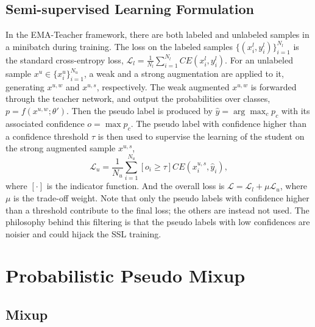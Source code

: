 \documentclass{article}
\begin{document}
\subsection{Semi-supervised Learning Formulation}

In the EMA-Teacher framework, there are both labeled and unlabeled
samples in a minibatch during training. 
The loss on the labeled samples $\{(x^l_i,y^l_i)\}^{N_l}_{i=1}$ is the standard cross-entropy loss, $\mathcal{L}_l=\frac{1}{N_l}\sum_{i=1}^{N_l}CE(x^l_i,y^l_i)$. For an unlabeled sample $x^u\in\{x^u_i\}^{N_u}_{i=1}$, a weak and a strong augmentation are applied to it, generating $x^{u,w}$ and $x^{u,s}$, respectively. The weak augmented $x^{u,w}$ is forwarded through the teacher network, and output the probabilities over classes, $p=f(x^{u,w};\theta')$. Then the pseudo label is produced by $\hat{y}=\arg\max_c p_c$ with its associated confidence $o=\max p_c$. The pseudo label with confidence higher than a confidence threshold $\tau$ is then used to supervise the learning of the student on the strong augmented sample $x^{u,s}$,
\begin{equation}
    \mathcal{L}_u=\frac{1}{N_u}\sum_{i=1}^{N_u}[o_i\geq\tau]CE(x^{u,s}_i,\hat{y}_i),
\label{equ:loss_u}
\end{equation}
where $[\cdot]$ is the indicator function. And the overall loss is $\mathcal{L}=\mathcal{L}_l+\mu\mathcal{L}_u$, where $\mu$ is the trade-off weight. Note that only the pseudo labels with confidence higher than a threshold contribute to the final loss; the others are instead not used. The philosophy behind this filtering is that the pseudo labels with low confidences are noisier and could hijack the SSL training.  


\section{Probabilistic Pseudo Mixup}
\label{sec:mixup}

\subsection{Mixup}
\end{document}
